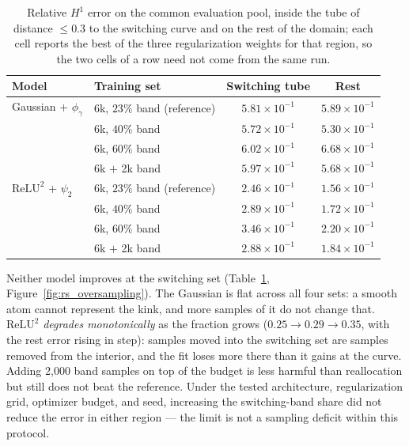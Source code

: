 \documentclass[11pt]{amsart}
\theoremstyle{definition}
\theoremstyle{remark}
\begin{document}
\begin{table}[htbp]
\centering
\setlength{\tabcolsep}{12pt}
\renewcommand{\arraystretch}{1.25}
\begin{tabular}{llcc}
\toprule
Model & Training set & Switching tube & Rest \\
\midrule
Gaussian + $\phi_{\gamma}$ & 6k, $23\%$ band (reference) & $5.81 \times 10^{-1}$ & $5.89 \times 10^{-1}$ \\
 & 6k, $40\%$ band & $5.72 \times 10^{-1}$ & $5.30 \times 10^{-1}$ \\
 & 6k, $60\%$ band & $6.02 \times 10^{-1}$ & $6.68 \times 10^{-1}$ \\
 & 6k $+$ 2k band & $5.97 \times 10^{-1}$ & $5.68 \times 10^{-1}$ \\
\midrule
$\mathrm{ReLU}^{2}$ + $\psi_{2}$ & 6k, $23\%$ band (reference) & $2.46 \times 10^{-1}$ & $1.56 \times 10^{-1}$ \\
 & 6k, $40\%$ band & $2.89 \times 10^{-1}$ & $1.72 \times 10^{-1}$ \\
 & 6k, $60\%$ band & $3.46 \times 10^{-1}$ & $2.20 \times 10^{-1}$ \\
 & 6k $+$ 2k band & $2.88 \times 10^{-1}$ & $1.84 \times 10^{-1}$ \\
\bottomrule
\end{tabular}
\caption{Relative $H^{1}$ error on the common evaluation pool, inside the tube
of distance $\le 0.3$ to the switching curve and on the rest of the domain;
each cell reports the best of the three regularization weights for that region,
so the two cells of a row need not come from the same run.}
\label{tab:rs_oversampling}
\end{table}

Neither model improves at the switching set
(Table~\ref{tab:rs_oversampling}, Figure~\ref{fig:rs_oversampling}). The
Gaussian is flat across all four sets: a smooth atom cannot represent the kink, and more samples of it do not change that.
$\mathrm{ReLU}^{2}$ \emph{degrades monotonically} as the fraction grows
($0.25 \to 0.29 \to 0.35$, with the rest error rising in step):
samples moved into the switching set are samples removed from the interior, and the fit
loses more there than it gains at the curve. Adding 2{,}000 band samples on top
of the budget is less harmful than reallocation but still does not beat the
reference. Under the tested architecture, regularization grid, optimizer budget, and seed, increasing the switching-band share did not reduce the error in either region --- the limit is not a sampling deficit within this protocol.
\end{document}
